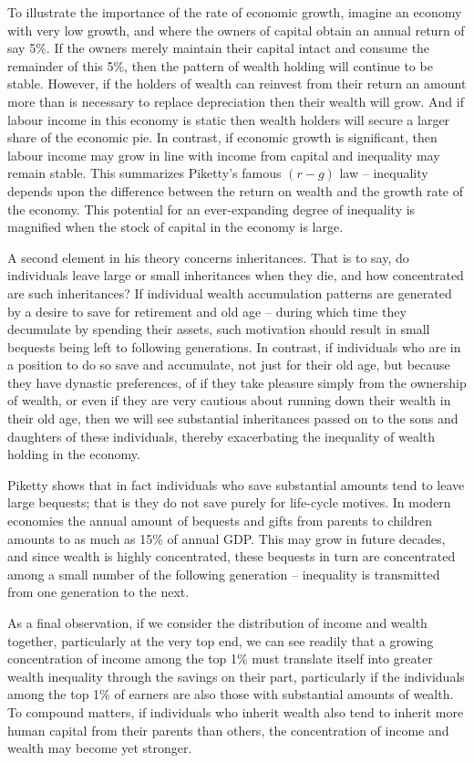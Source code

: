 To illustrate the importance of the rate of economic growth, imagine an economy with very low growth, and where the owners of capital obtain an annual return of say 5\%. If the owners merely maintain their capital intact and consume the remainder of this 5\%, then the pattern of wealth holding will continue to be stable. However, if the holders of wealth can reinvest from their return an amount more than is necessary to replace depreciation then their wealth will grow. And if labour income in this economy is static then wealth holders will secure a larger share of the economic pie. In contrast, if economic growth is significant, then labour income may grow in line with income from capital and inequality may remain stable. This summarizes Piketty's famous $(r-g)$ law -- inequality depends upon the difference between the return on wealth and the growth rate of the economy. This potential for an ever-expanding degree of inequality is magnified when the stock of capital in the economy is large.

A second element in his theory concerns inheritances. That is to say, do individuals leave large or small inheritances when they die, and how concentrated are such inheritances? If individual wealth accumulation patterns are generated by a desire to save for retirement and old age -- during which time they decumulate by spending their assets, such motivation should result in small bequests being left to following generations. In contrast, if individuals who are in a position to do so save and accumulate, not just for their old age, but because they have dynastic preferences, of if they take pleasure simply from the ownership of wealth, or even if they are very cautious about running down their wealth in their old age, then we will see substantial inheritances passed on to the sons and daughters of these individuals, thereby exacerbating the inequality of wealth holding in the economy.

Piketty shows that in fact individuals who save substantial amounts tend to leave large bequests; that is they do not save purely for life-cycle motives. In modern economies the annual amount of bequests and gifts from parents to children amounts to as much as 15\% of annual GDP. This may grow in future decades, and since wealth is highly concentrated, these bequests in turn are concentrated among a small number of the following generation -- inequality is transmitted from one generation to the next.

As a final observation, if we consider the distribution of income and wealth together, particularly at the very top end, we can see readily that a growing concentration of income among the top 1\% must translate itself into greater wealth inequality through the savings on their part, particularly if the individuals among the top 1\% of earners are also those with substantial amounts of wealth. To compound matters, if individuals who inherit wealth also tend to inherit more human capital from their parents than others, the concentration of income and wealth may become yet stronger.

